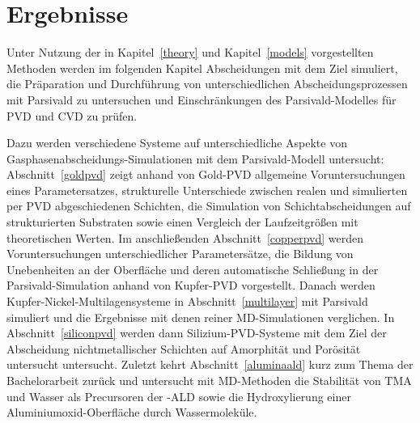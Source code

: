 \chapter{Ergebnisse}
\label{results}

Unter Nutzung der in Kapitel~\ref{theory} und Kapitel~\ref{models} vorgestellten Methoden werden im folgenden Kapitel Abscheidungen mit dem Ziel simuliert, die Präparation und Durchführung von unterschiedlichen Abscheidungsprozessen mit Parsivald zu untersuchen und Einschränkungen des Parsivald-Modelles für PVD und CVD zu prüfen.

Dazu werden verschiedene Systeme auf unterschiedliche Aspekte von Gas\-phasen\-abschei\-dungs-Simu\-la\-tionen mit dem Parsivald-Modell untersucht:
Abschnitt~\ref{goldpvd} zeigt anhand von Gold-PVD allgemeine Voruntersuchungen eines Parametersatzes, strukturelle Unterschiede zwischen realen und simulierten per PVD abgeschiedenen Schichten, die Simulation von Schichtabscheidungen auf strukturierten Substraten sowie einen Vergleich der Laufzeitgrößen mit theoretischen Werten.
Im anschließenden Abschnitt~\ref{copperpvd} werden Voruntersuchungen unterschiedlicher Parametersätze, die Bildung von Unebenheiten an der Oberfläche und deren automatische Schließung in der Parsivald-Simulation anhand von Kupfer-PVD vorgestellt.
Danach werden Kupfer-Nickel-Multi\-lagen\-systeme in Abschnitt~\ref{multilayer} mit Parsivald simuliert und die Ergebnisse mit denen reiner MD-Simulationen verglichen.
In Abschnitt~\ref{siliconpvd} werden dann Silizium-PVD-Systeme mit dem Ziel der Abscheidung nichtmetallischer Schichten auf Amorphität und Porösität untersucht untersucht.
Zuletzt kehrt Abschnitt~\ref{aluminaald} kurz zum Thema der Bachelorarbeit zurück und untersucht mit MD-Methoden die Stabilität von TMA und Wasser als Precursoren der -ALD sowie die Hydroxylierung einer Aluminiumoxid-Oberfläche durch Wassermoleküle.


\clearpage

\clearpage

\clearpage

\clearpage

